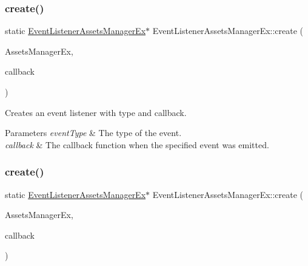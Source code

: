 \subsubsection{\texorpdfstring{create()}{create()}\hspace{0.1cm}{\footnotesize\ttfamily [1/2]}}
{\footnotesize\ttfamily static \hyperlink{classEventListenerAssetsManagerEx}{Event\+Listener\+Assets\+Manager\+Ex}$\ast$ Event\+Listener\+Assets\+Manager\+Ex\+::create (\begin{DoxyParamCaption}\item[{\hyperlink{classAssetsManagerEx}{Assets\+Manager\+Ex} $\ast$}]{Assets\+Manager\+Ex,  }\item[{const std\+::function$<$ void(\hyperlink{classEventAssetsManagerEx}{Event\+Assets\+Manager\+Ex} $\ast$)$>$ \&}]{callback }\end{DoxyParamCaption})\hspace{0.3cm}{\ttfamily [static]}}

Creates an event listener with type and callback. 
\begin{DoxyParams}{Parameters}
{\em event\+Type} & The type of the event. \\
\hline
{\em callback} & The callback function when the specified event was emitted. \\
\hline
\end{DoxyParams}
\mbox{\label{classEventListenerAssetsManagerEx_ab3d0581850c89016c1b9737c75e110ac}} 
\subsubsection{\texorpdfstring{create()}{create()}\hspace{0.1cm}{\footnotesize\ttfamily [2/2]}}
{\footnotesize\ttfamily static \hyperlink{classEventListenerAssetsManagerEx}{Event\+Listener\+Assets\+Manager\+Ex}$\ast$ Event\+Listener\+Assets\+Manager\+Ex\+::create (\begin{DoxyParamCaption}\item[{\hyperlink{classAssetsManagerEx}{Assets\+Manager\+Ex} $\ast$}]{Assets\+Manager\+Ex,  }\item[{const std\+::function$<$ void(\hyperlink{classEventAssetsManagerEx}{Event\+Assets\+Manager\+Ex} $\ast$)$>$ \&}]{callback }\end{DoxyParamCaption})\hspace{0.3cm}{\ttfamily [static]}}

